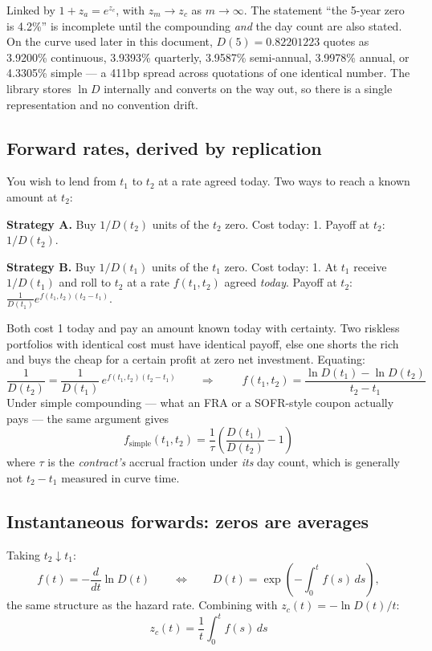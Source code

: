 \documentclass[11pt,a4paper]{article}
\begin{document}
Linked by $1 + z_a = e^{z_c}$, with $z_m \to z_c$ as $m \to \infty$. The statement
``the 5-year zero is 4.2\%'' is incomplete until the compounding \emph{and} the day count are
also stated. On the curve used later in this document, $D(5) = 0.82201223$ quotes as
3.9200\% continuous, 3.9393\% quarterly, 3.9587\% semi-annual, 3.9978\% annual, or 4.3305\%
simple --- a 411bp spread across quotations of one identical number. The library stores
$\ln D$ internally and converts on the way out, so there is a single representation and no
convention drift.

\subsection{Forward rates, derived by replication}

You wish to lend from $t_1$ to $t_2$ at a rate agreed today. Two ways to reach a known
amount at $t_2$:

\textbf{Strategy A.} Buy $1/D(t_2)$ units of the $t_2$ zero. Cost today: 1. Payoff at $t_2$:
$1/D(t_2)$.

\textbf{Strategy B.} Buy $1/D(t_1)$ units of the $t_1$ zero. Cost today: 1. At $t_1$ receive
$1/D(t_1)$ and roll to $t_2$ at a rate $f(t_1,t_2)$ agreed \emph{today}. Payoff at $t_2$:
$\frac{1}{D(t_1)}e^{f(t_1,t_2)(t_2-t_1)}$.

Both cost 1 today and pay an amount known today with certainty. Two riskless portfolios with
identical cost must have identical payoff, else one shorts the rich and buys the cheap for a
certain profit at zero net investment. Equating:
\[
\frac{1}{D(t_2)} = \frac{1}{D(t_1)}\,e^{f(t_1,t_2)(t_2-t_1)}
\qquad\Longrightarrow\qquad
\boxed{\;f(t_1,t_2) = \frac{\ln D(t_1) - \ln D(t_2)}{t_2 - t_1}\;}
\]
Under simple compounding --- what an FRA or a SOFR-style coupon actually pays --- the same
argument gives
\[
f_{\text{simple}}(t_1,t_2) = \frac{1}{\tau}\left(\frac{D(t_1)}{D(t_2)} - 1\right)
\]
where $\tau$ is the \emph{contract's} accrual fraction under \emph{its} day count, which is
generally not $t_2 - t_1$ measured in curve time.

\subsection{Instantaneous forwards: zeros are averages}

Taking $t_2 \downarrow t_1$:
\[
f(t) = -\frac{d}{dt}\ln D(t)
\qquad\Longleftrightarrow\qquad
D(t) = \exp\!\left(-\int_0^t f(s)\,ds\right),
\]
the same structure as the hazard rate. Combining with $z_c(t) = -\ln D(t)/t$:
\begin{equation}
z_c(t) = \frac{1}{t}\int_0^t f(s)\,ds
\end{equation}
\end{document}
